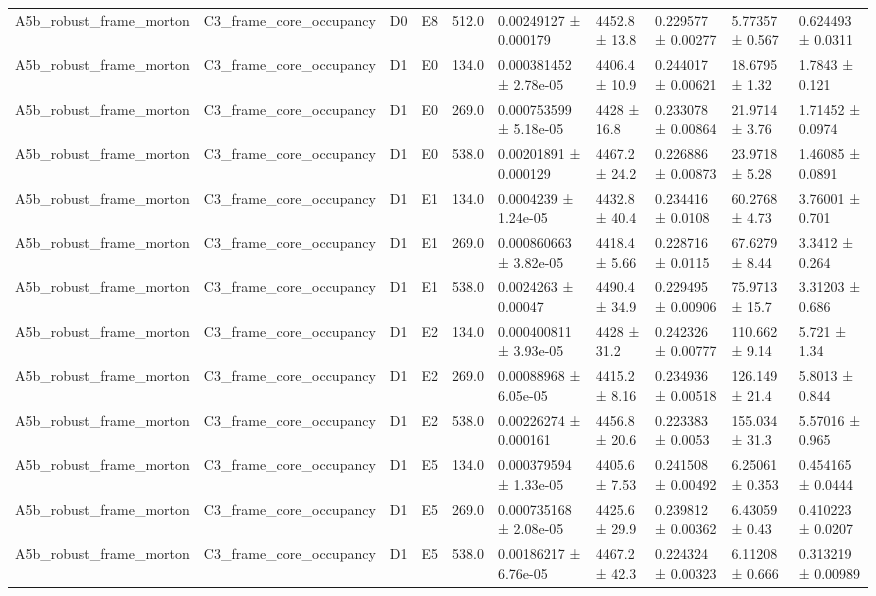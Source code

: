 \begin{table}
\begin{tabular}{llllllllll}
A5b\_robust\_frame\_morton & C3\_frame\_core\_occupancy & D0 & E8 & 512.0 & 0.00249127 ± 0.000179 & 4452.8 ± 13.8 & 0.229577 ± 0.00277 & 5.77357 ± 0.567 & 0.624493 ± 0.0311 \\
A5b\_robust\_frame\_morton & C3\_frame\_core\_occupancy & D1 & E0 & 134.0 & 0.000381452 ± 2.78e-05 & 4406.4 ± 10.9 & 0.244017 ± 0.00621 & 18.6795 ± 1.32 & 1.7843 ± 0.121 \\
A5b\_robust\_frame\_morton & C3\_frame\_core\_occupancy & D1 & E0 & 269.0 & 0.000753599 ± 5.18e-05 & 4428 ± 16.8 & 0.233078 ± 0.00864 & 21.9714 ± 3.76 & 1.71452 ± 0.0974 \\
A5b\_robust\_frame\_morton & C3\_frame\_core\_occupancy & D1 & E0 & 538.0 & 0.00201891 ± 0.000129 & 4467.2 ± 24.2 & 0.226886 ± 0.00873 & 23.9718 ± 5.28 & 1.46085 ± 0.0891 \\
A5b\_robust\_frame\_morton & C3\_frame\_core\_occupancy & D1 & E1 & 134.0 & 0.0004239 ± 1.24e-05 & 4432.8 ± 40.4 & 0.234416 ± 0.0108 & 60.2768 ± 4.73 & 3.76001 ± 0.701 \\
A5b\_robust\_frame\_morton & C3\_frame\_core\_occupancy & D1 & E1 & 269.0 & 0.000860663 ± 3.82e-05 & 4418.4 ± 5.66 & 0.228716 ± 0.0115 & 67.6279 ± 8.44 & 3.3412 ± 0.264 \\
A5b\_robust\_frame\_morton & C3\_frame\_core\_occupancy & D1 & E1 & 538.0 & 0.0024263 ± 0.00047 & 4490.4 ± 34.9 & 0.229495 ± 0.00906 & 75.9713 ± 15.7 & 3.31203 ± 0.686 \\
A5b\_robust\_frame\_morton & C3\_frame\_core\_occupancy & D1 & E2 & 134.0 & 0.000400811 ± 3.93e-05 & 4428 ± 31.2 & 0.242326 ± 0.00777 & 110.662 ± 9.14 & 5.721 ± 1.34 \\
A5b\_robust\_frame\_morton & C3\_frame\_core\_occupancy & D1 & E2 & 269.0 & 0.00088968 ± 6.05e-05 & 4415.2 ± 8.16 & 0.234936 ± 0.00518 & 126.149 ± 21.4 & 5.8013 ± 0.844 \\
A5b\_robust\_frame\_morton & C3\_frame\_core\_occupancy & D1 & E2 & 538.0 & 0.00226274 ± 0.000161 & 4456.8 ± 20.6 & 0.223383 ± 0.0053 & 155.034 ± 31.3 & 5.57016 ± 0.965 \\
A5b\_robust\_frame\_morton & C3\_frame\_core\_occupancy & D1 & E5 & 134.0 & 0.000379594 ± 1.33e-05 & 4405.6 ± 7.53 & 0.241508 ± 0.00492 & 6.25061 ± 0.353 & 0.454165 ± 0.0444 \\
A5b\_robust\_frame\_morton & C3\_frame\_core\_occupancy & D1 & E5 & 269.0 & 0.000735168 ± 2.08e-05 & 4425.6 ± 29.9 & 0.239812 ± 0.00362 & 6.43059 ± 0.43 & 0.410223 ± 0.0207 \\
A5b\_robust\_frame\_morton & C3\_frame\_core\_occupancy & D1 & E5 & 538.0 & 0.00186217 ± 6.76e-05 & 4467.2 ± 42.3 & 0.224324 ± 0.00323 & 6.11208 ± 0.666 & 0.313219 ± 0.00989 \\

\end{tabular}
\end{table}
